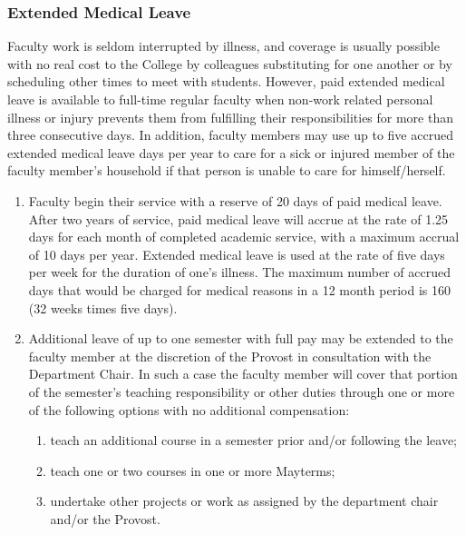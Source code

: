 		\subsubsection{Extended Medical Leave}
			Faculty work is seldom interrupted by illness, and coverage is usually possible with no real cost to the College by colleagues substituting for one another or by scheduling other times to meet with students.  However, paid extended medical leave is available to full-time regular faculty when non-work related personal illness or injury prevents them from fulfilling their responsibilities for more than three consecutive days.  In addition, faculty members may use up to five accrued extended medical leave days per year to care for a sick or injured member of the faculty member's household if that person is unable to care for himself/herself.
			\begin{enumerate}[label=\alph*)]

				\item{ Faculty begin their service with a reserve of 20 days of paid
					medical leave.  After two years of service, paid medical leave will
					accrue at the rate of 1.25 days for each month of completed academic
					service, with a maximum accrual of 10 days per year.  Extended
					medical leave is used at the rate of five days per week for the
					duration of one's illness. The maximum number of accrued days that
					would be charged for medical reasons in a 12 month period is 160 (32
					weeks times five days). }

				\item{ Additional leave of up to one semester with full pay may be
					extended to the faculty member at the discretion of the Provost in
					consultation with the Department Chair.  In such a case the faculty
					member will cover that portion of the semester's teaching
					responsibility or other duties through one or more of the following
					options with no additional compensation:


					\begin{enumerate}[label=\arabic*)]
						\item{ teach an additional course in a semester prior and/or
							following the leave; }

						\item{teach one or two courses in one or more Mayterms;}


						\item{ undertake other projects or work as assigned by the
							department chair and/or the Provost. }
					\end{enumerate}

}
\end{enumerate}
